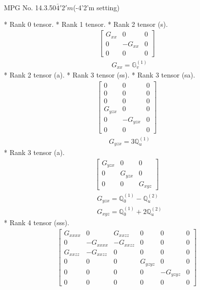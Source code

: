 \documentclass[fleqn,8pt,landscape]{jsarticle}
\begin{document}
\setcounter{MaxMatrixCols}{32}

\renewcommand{\tablename}{Table~}
\renewcommand{\figurename}{Figure~}
\begin{center}
\LARGE
MPG No. 14.3.50\quad$\bar{4}'2'm$\quad(-4'2'm setting)
\end{center}
* Rank 0 tensor.
* Rank 1 tensor.
* Rank 2 tensor (s).
\begin{align*}
\begin{bmatrix} G_{xx} & 0 & 0 \\ 0 & - G_{xx} & 0 \\ 0 & 0 & 0 \end{bmatrix}
\end{align*}
\begin{align*}
& G_{xx} = \mathbb{G}_{v}^{(1)}
\end{align*}
* Rank 2 tensor (a).
* Rank 3 tensor (ss).
* Rank 3 tensor (sa).
\begin{align*}
\begin{bmatrix} 0 & 0 & 0 \\ 0 & 0 & 0 \\ 0 & 0 & 0 \\ G_{yzx} & 0 & 0 \\ 0 & - G_{yzx} & 0 \\ 0 & 0 & 0 \end{bmatrix}
\end{align*}
\begin{align*}
& G_{yzx} = 3 \mathbb{Q}_{u}^{(1)}
\end{align*}
* Rank 3 tensor (a).
\begin{align*}
\begin{bmatrix} G_{yzx} & 0 & 0 \\ 0 & G_{yzx} & 0 \\ 0 & 0 & G_{xyz} \end{bmatrix}
\end{align*}
\begin{align*}
& G_{yzx} = \mathbb{Q}_{0}^{(1)} - \mathbb{Q}_{u}^{(2)} \\
& G_{xyz} = \mathbb{Q}_{0}^{(1)} + 2 \mathbb{Q}_{u}^{(2)}
\end{align*}
* Rank 4 tensor (sss).
\begin{align*}
\begin{bmatrix} G_{xxxx} & 0 & G_{xxzz} & 0 & 0 & 0 \\ 0 & - G_{xxxx} & - G_{xxzz} & 0 & 0 & 0 \\ G_{xxzz} & - G_{xxzz} & 0 & 0 & 0 & 0 \\ 0 & 0 & 0 & G_{yzyz} & 0 & 0 \\ 0 & 0 & 0 & 0 & - G_{yzyz} & 0 \\ 0 & 0 & 0 & 0 & 0 & 0 \end{bmatrix}
\end{align*}
\end{document}
